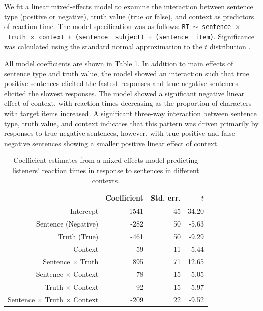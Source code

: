 \documentclass[man, noapacite]{apa2}
\begin{document}
We fit a linear mixed-effects model to examine the interaction between sentence type (positive or negative), truth value (true or false), and context as predictors of reaction time. The model specification was as follows: \texttt{RT $\sim$ sentence~$\times$~truth~$\times$~context + (sentence~\textbar~subject) +  (sentence~\textbar~item)}.  Significance was calculated using the standard normal approximation to the $t$ distribution \cite{barr2013}.

All model coefficients are shown in Table \ref{tab:listenermodel}. In addition to main effects of sentence type and truth value, the model showed an interaction such that true positive sentences elicited the fastest responses and true negative sentences elicited the slowest responses. The model showed a significant negative linear effect of context, with reaction times decreasing as the proportion of characters with target items increased. A significant three-way interaction between sentence type, truth value, and context indicates that this pattern was driven primarily by responses to true negative sentences, however, with true positive and false negative sentences showing a smaller positive linear effect of context.  

\begin{table}[t]
\caption{\label{tab:listenermodel} Coefficient estimates from a mixed-effects model predicting listeners' reaction times in response to sentences in different contexts.}
\begin{center}
\begin{tabular}{rrrr}
  \hline
 & Coefficient & Std. err. & $t$ \\ 
  \hline
Intercept & 1541 & 45 & 34.20 \\ 
  Sentence (Negative) & -282 & 50 & -5.63  \\ 
  Truth (True) & -461 & 50 & -9.29 \\
  Context & -59 & 11 & -5.44 \\ 
  Sentence $\times$ Truth & 895 & 71 & 12.65 \\
  Sentence $\times$ Context & 78 & 15 & 5.05 \\
  Truth $\times$ Context & 92 & 15 & 5.97 \\
  Sentence $\times$ Truth $\times$ Context & -209 & 22 & -9.52 \\
   \hline
\end{tabular}
\vspace{-1.5cm}
\end{center}
\end{table}
\end{document}
